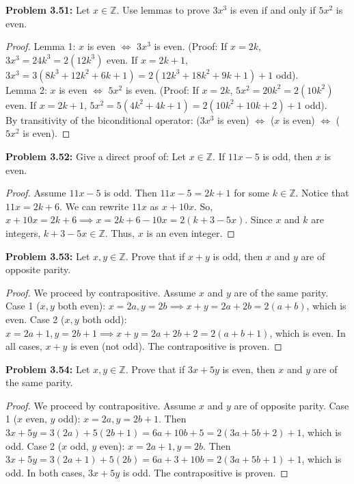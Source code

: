 \documentclass[11pt, letterpaper]{article}
\theoremstyle{definition}
\theoremstyle{remark}
\newcommand{\Z}{\mathbb{Z}}
\begin{document}
\textbf{Problem 3.51:} Let $x \in \Z$. Use lemmas to prove $3x^3$ is even if and only if $5x^2$ is even.
\begin{proof}
Lemma 1: $x$ is even $\iff$ $3x^3$ is even. (Proof: If $x=2k$, $3x^3 = 24k^3 = 2(12k^3)$ even. If $x=2k+1$, $3x^3 = 3(8k^3+12k^2+6k+1) = 2(12k^3+18k^2+9k+1)+1$ odd). \\
Lemma 2: $x$ is even $\iff$ $5x^2$ is even. (Proof: If $x=2k$, $5x^2 = 20k^2 = 2(10k^2)$ even. If $x=2k+1$, $5x^2 = 5(4k^2+4k+1) = 2(10k^2+10k+2)+1$ odd). \\
By transitivity of the biconditional operator: ($3x^3$ is even) $\iff$ ($x$ is even) $\iff$ ($5x^2$ is even).
\end{proof}

\textbf{Problem 3.52:} Give a direct proof of: Let $x \in \Z$. If $11x-5$ is odd, then $x$ is even.
\begin{proof}
Assume $11x-5$ is odd. Then $11x-5 = 2k+1$ for some $k \in \Z$. 
Notice that $11x = 2k+6$. We can rewrite $11x$ as $x + 10x$. 
So, $x + 10x = 2k + 6 \implies x = 2k + 6 - 10x = 2(k + 3 - 5x)$.
Since $x$ and $k$ are integers, $k+3-5x \in \Z$. Thus, $x$ is an even integer.
\end{proof}

\textbf{Problem 3.53:} Let $x, y \in \Z$. Prove that if $x+y$ is odd, then $x$ and $y$ are of opposite parity.
\begin{proof}
We proceed by contrapositive. Assume $x$ and $y$ are of the same parity. 
Case 1 ($x, y$ both even): $x=2a, y=2b \implies x+y = 2a+2b = 2(a+b)$, which is even.
Case 2 ($x, y$ both odd): $x=2a+1, y=2b+1 \implies x+y = 2a+2b+2 = 2(a+b+1)$, which is even.
In all cases, $x+y$ is even (not odd). The contrapositive is proven.
\end{proof}

\textbf{Problem 3.54:} Let $x, y \in \Z$. Prove that if $3x+5y$ is even, then $x$ and $y$ are of the same parity.
\begin{proof}
We proceed by contrapositive. Assume $x$ and $y$ are of opposite parity.
Case 1 ($x$ even, $y$ odd): $x=2a, y=2b+1$. Then $3x+5y = 3(2a) + 5(2b+1) = 6a + 10b + 5 = 2(3a+5b+2) + 1$, which is odd.
Case 2 ($x$ odd, $y$ even): $x=2a+1, y=2b$. Then $3x+5y = 3(2a+1) + 5(2b) = 6a + 3 + 10b = 2(3a+5b+1) + 1$, which is odd.
In both cases, $3x+5y$ is odd. The contrapositive is proven.
\end{proof}
\end{document}
